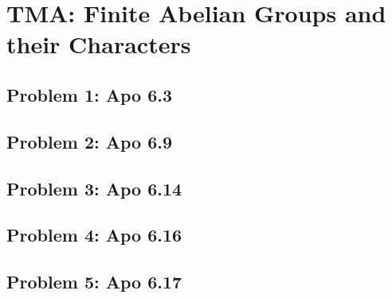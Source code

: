 \section{TMA: Finite Abelian Groups and their Characters}

\subsection[Problem 1]{Problem 1: Apo 6.3}

\subsection[Problem 2]{Problem 2: Apo 6.9}

\subsection[Problem 3]{Problem 3: Apo 6.14}

\subsection[Problem 4]{Problem 4: Apo 6.16}

\subsection[Problem 5]{Problem 5: Apo 6.17}